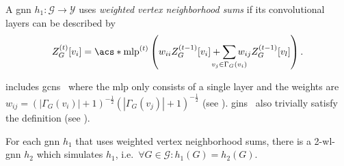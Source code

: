 \begin{defn}\label{defn:ltd:vert-conv}
	A \ac{gnn} $h_1: \mathcal{G} \to \mathcal{Y}$ uses \textit{weighted vertex neighborhood sums} if its convolutional layers can be described by
	\begin{align*}
		Z_{G}^{(t)}[v_i] = \mathrm{\acs*{mlp}}^{(t)}\left( w_{ii} Z_{G}^{(t-1)}[v_i] + \smashoperator[lr]{\sum_{v_j \in \Gamma_G(v_i)}} w_{ij} Z_{G}^{(t-1)}[v_l] \right)
		\text{.}
	\end{align*}
\end{defn}
 includes \acp{gcn}~\cite{Kipf2017} where the \ac{mlp} only consists of a single layer and the weights are $w_{ij} = {\left(\left| \Gamma_G(v_i) \right| + 1\right)}^{-\frac{1}{2}}{\left(\left| \Gamma_G(v_j) \right| + 1\right)}^{-\frac{1}{2}}$ (see ).
\Acp{gin}~\cite{Xu2018} also trivially satisfy the definition (see ).
\begin{thm}\label{thm:ltd:wl2-simulation}
	For each \ac{gnn} $h_1$ that uses weighted vertex neighborhood sums, there is a 2-\acs{wl}-\acs{gnn} $h_2$ which simulates $h_1$, i.e.\ $\forall G \in \mathcal{G}: h_1(G) = h_2(G)$.
\end{thm}
